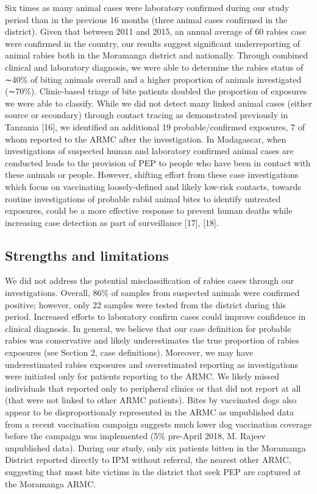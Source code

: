 \documentclass[
]{book}
\begin{document}
Six times as many animal cases were laboratory confirmed during our study period than in the previous 16 months (three animal cases confirmed in the district). Given that between 2011 and 2015, an annual average of 60 rabies case were confirmed in the country, our results suggest significant underreporting of animal rabies both in the Moramanga district and nationally. Through combined clinical and laboratory diagnosis, we were able to determine the rabies status of ∼40\% of biting animals overall and a higher proportion of animals investigated (∼70\%). Clinic-based triage of bite patients doubled the proportion of exposures we were able to classify. While we did not detect many linked animal cases (either source or secondary) through contact tracing as demonstrated previously in Tanzania {[}16{]}, we identified an additional 19 probable/confirmed exposures, 7 of whom reported to the ARMC after the investigation. In Madagascar, when investigations of suspected human and laboratory confirmed animal cases are conducted leads to the provision of PEP to people who have been in contact with these animals or people. However, shifting effort from these case investigations which focus on vaccinating loosely-defined and likely low-risk contacts, towards routine investigations of probable rabid animal bites to identify untreated exposures, could be a more effective response to prevent human deaths while increasing case detection as part of surveillance {[}17{]}, {[}18{]}.

\hypertarget{strengths-and-limitations}{%
\subsection{Strengths and limitations}\label{strengths-and-limitations}}

We did not address the potential misclassification of rabies cases through our investigations. Overall, 86\% of samples from suspected animals were confirmed positive; however, only 22 samples were tested from the district during this period. Increased efforts to laboratory confirm cases could improve confidence in clinical diagnosis. In general, we believe that our case definition for probable rabies was conservative and likely underestimates the true proportion of rabies exposures (see Section 2, case definitions). Moreover, we may have underestimated rabies exposures and overestimated reporting as investigations were initiated only for patients reporting to the ARMC. We likely missed individuals that reported only to peripheral clinics or that did not report at all (that were not linked to other ARMC patients). Bites by vaccinated dogs also appear to be disproportionaly represented in the ARMC as unpublished data from a recent vaccination campaign suggests much lower dog vaccination coverage before the campaign was implemented (5\% pre-April 2018, M. Rajeev unpublished data). During our study, only six patients bitten in the Moramanga District reported directly to IPM without referral, the nearest other ARMC, suggesting that most bite victims in the district that seek PEP are captured at the Moramanga ARMC.
\end{document}
